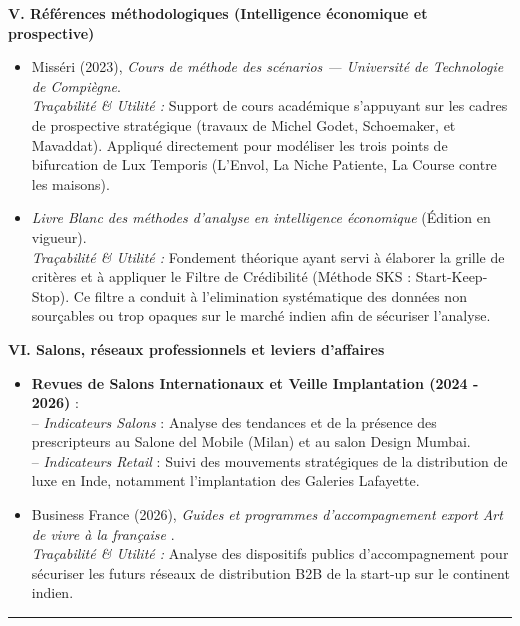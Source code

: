 \documentclass[11pt,a4paper]{article}
\begin{document}
\vspace{0.8em}
\textbf{V. Références méthodologiques (Intelligence économique et prospective)}
\begin{itemize}
  \item Misséri (2023), \textit{Cours de méthode des scénarios — Université de Technologie de Compiègne}. \\
  \textit{Traçabilité \& Utilité :} Support de cours académique s'appuyant sur les cadres de prospective stratégique (travaux de Michel Godet, Schoemaker, et Mavaddat). Appliqué directement pour modéliser les trois points de bifurcation de Lux Temporis (L'Envol, La Niche Patiente, La Course contre les maisons).
  
  \item \textit{Livre Blanc des méthodes d’analyse en intelligence économique} (Édition en vigueur). \\
  \textit{Traçabilité \& Utilité :} Fondement théorique ayant servi à élaborer la grille de critères et à appliquer le Filtre de Crédibilité (Méthode SKS : Start-Keep-Stop). Ce filtre a conduit à l'elimination systématique des données non sourçables ou trop opaques sur le marché indien afin de sécuriser l'analyse.
\end{itemize}

\vspace{0.8em}
\textbf{VI. Salons, réseaux professionnels et leviers d'affaires}
\begin{itemize}
  \item \textbf{Revues de Salons Internationaux et Veille Implantation (2024 - 2026)} :
  \\ -- \textit{Indicateurs Salons} : Analyse des tendances et de la présence des prescripteurs au Salone del Mobile (Milan) et au salon Design Mumbai.
  \\ -- \textit{Indicateurs Retail} : Suivi des mouvements stratégiques de la distribution de luxe en Inde, notamment l'implantation des Galeries Lafayette.
  
  \item Business France (2026), \textit{Guides et programmes d'accompagnement export \og Art de vivre à la française \fg{}}. \\
  \textit{Traçabilité \& Utilité :} Analyse des dispositifs publics d'accompagnement pour sécuriser les futurs réseaux de distribution B2B de la start-up sur le continent indien.
\end{itemize}

\vspace{1em}
\noindent\rule{\linewidth}{0.4pt}\\
\end{document}
